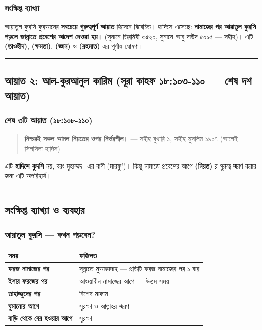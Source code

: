\subsubsection*{সংক্ষিপ্ত ব্যাখ্যা}
আয়াতুল কুরসি কুরআনের \textbf{সবচেয়ে গুরুত্বপূর্ণ আয়াত} হিসেবে বিবেচিত। হাদিসে এসেছে: \textbf{নামাজের পর আয়াতুল কুরসি পড়লে জান্নাতে প্রবেশের আদেশ দেওয়া হয়।} (সুনানে তিরমিযী ৩৫২০, সুনানে আবু দাউদ ৫০১৫ — সহীহ)। এটি \textbf{ (তাওহীদ)}, \textbf{ (ক্ষমতা)}, \textbf{ (জ্ঞান)} ও \textbf{ (রহমাত)}-এর পূর্ণাঙ্গ ঘোষণা।

\medskip\hrule\medskip

\subsection*{আয়াত ২: আল-কুরআনুল কারিম (সূরা কাহফ ১৮:১০৩-১১০ — শেষ দশ আয়াত)}

\subsubsection*{শেষ ৩টি আয়াত (১৮:১০৮-১১০)}

\begin{center}\end{center}

\begin{quote}
\textbf{নিশ্চয়ই সকল আমল নিয়তের ওপর নির্ভরশীল।} — সহীহ বুখারি ১, সহীহ মুসলিম ১৯০৭ (আলেই সিলসিলা হাদিস)
\end{quote}

এটি \textbf{হাদিসে কুদসি} নয়, বরং মুহাম্মদ -এর বাণী (মারফু')। কিন্তু নামাজে প্রবেশের আগে \textbf{ (নিয়ত)}-র গুরুত্ব স্মরণ করার জন্য এটি অপরিহার্য।

\medskip\hrule\medskip

\subsection*{সংক্ষিপ্ত ব্যাখ্যা ও ব্যবহার}

\subsubsection*{আয়াতুল কুরসি — কখন পড়বেন?}

\begin{table}[h]\centering\small
\begin{tabular}{ll}
সময় & ফজিলত \\
\hline
\textbf{ফরজ নামাজের পর} & সুন্নাতে মুআক্কাদাহ — প্রতিটি ফরজ নামাজের পর ১ বার \\
\textbf{ইশার ফরজের পর} & আওয়াবীন নামাজের আগে — উত্তম সময় \\
\textbf{তাহাজ্জুদের পর} & বিশেষ মাকাম \\
\textbf{ঘুমানোর আগে} & সুরক্ষা ও আল্লাহর স্মরণ \\
\textbf{বাড়ি থেকে বের হওয়ার আগে} & সুরক্ষা \\
\hline
\end{tabular}
\end{table}


